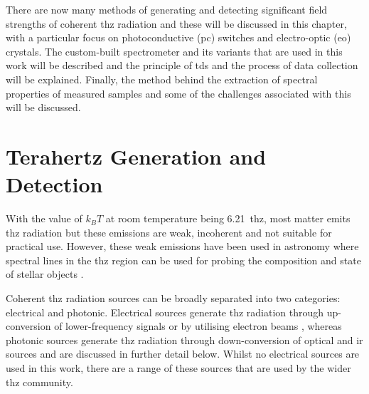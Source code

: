 There are now many methods of generating and detecting significant field strengths of coherent \acrshort{thz} radiation and these will be discussed in this chapter, with a particular focus on photoconductive (\acrshort{pc}) switches and electro\nobreakdash-optic (\acrshort{eo}) crystals. 
The custom\nobreakdash-built spectrometer and its variants that are used in this work will be described and the principle of \acrshort{tds} and the process of data collection will be explained. 
Finally, the method behind the extraction of spectral properties of measured samples and some of the challenges associated with this will be discussed.

\section{Terahertz Generation and Detection}
With the value of \(k_BT\) at room temperature being \SI{6.21}{\acrshort{thz}}, most matter emits \acrshort{thz} radiation but these emissions are weak, incoherent and not suitable for practical use. However, these weak emissions have been used in astronomy where spectral lines in the \acrshort{thz} region can be used for probing the composition and state of stellar objects \cite{Stacey2011}.

Coherent \acrshort{thz} radiation sources can be broadly separated into two categories: electrical and photonic. Electrical sources generate \acrshort{thz} radiation through up\nobreakdash-conversion of lower\nobreakdash-frequency signals \cite{Orihashi2005, Davies2002, Gold1998} or by utilising electron beams \cite{He2013, Schmidt2002, Williams2002}, whereas photonic sources generate \acrshort{thz} radiation through down\nobreakdash-conversion of optical and \acrshort{ir} sources \cite{McIntosh1995, Dai2011, Warren1991, Wu1995} and are discussed in further detail below. Whilst no electrical sources are used in this work, there are a range of these sources that are used by the wider \acrshort{thz} community. 

